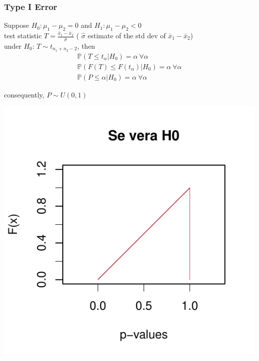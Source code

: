 \documentclass[xcolor={dvipsnames}]{beamer}
\begin{document}
\begin{frame}
\frametitle{Type I Error}

Suppose $H_0: \mu_1-\mu_2=0$ and $H_1: \mu_1-\mu_2<0$\\
test statistic $T=\frac{\bar{x}_1-\bar{x}_2}{\hat{\sigma}}$ ( $\hat{\sigma}$ estimate of the std dev of $\bar{x}_1-\bar{x}_2$)\\
under $H_0$: $T\sim t_{n_1+n_2-2}$, then
\begin{eqnarray*}
\mathbb{P}(T\leq t_\alpha | H_0) =\alpha \ \forall \alpha\\
\mathbb{P}(F(T)\leq F(t_\alpha) | H_0) =\alpha \ \forall \alpha\\
\mathbb{P}(P \leq \alpha | H_0) =\alpha \ \forall \alpha
\end{eqnarray*}
\vspace{-1.2cm}

\begin{minipage}{0.45\textwidth}
\centering
consequently, $P\sim U(0,1)$
\end{minipage}\hfill
\begin{minipage}{0.55\textwidth}
 \hspace{1cm} \includegraphics[width= .85\textwidth]{Slides/MTP/plaatjes/cdf_uniform}
\end{minipage}

\end{frame}
\end{document}
